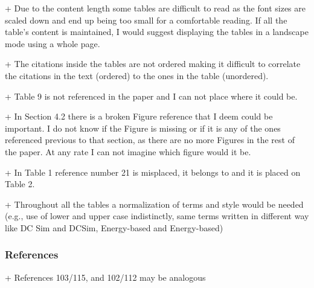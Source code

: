 


+ Due to the content length some tables are difficult to read as the font sizes are scaled down and end up being too small for a comfortable reading. If all the table's content is maintained, I would suggest displaying the tables in a landscape mode using a whole page.


+ The citations inside the tables are not ordered making it difficult to correlate the citations in the text (ordered) to the ones in the table (unordered).


+ Table 9 is not referenced in the paper and I can not place where it could be.


+ In Section 4.2 there is a broken Figure reference that I deem could be important. I do not know if the Figure is missing or if it is any of the ones referenced previous to that section, as there are no more Figures in the rest of the paper. At any rate I can not imagine which figure would it be.


+ In Table 1 reference number 21 is misplaced, it belongs to and it is
placed on Table 2.


+ Throughout all the tables a normalization of terms and style would be needed (e.g., use of lower and upper case indistinctly, same terms written in different way like DC Sim and DCSim, Energy-based and Energy-based)




\subsubsection{References}

+ References 103/115, and 102/112 may be analogous

